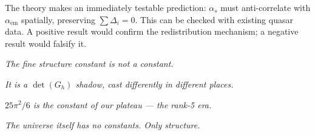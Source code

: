 The theory makes an immediately testable prediction: $\alpha_s$ must anti-correlate with $\alpha_\text{em}$ spatially, preserving $\sum\Delta_i = 0$. This can be checked with existing quasar data. A positive result would confirm the redistribution mechanism; a negative result would falsify it.

\begin{center}
\emph{The fine structure constant is not a constant.}

\emph{It is a $\det(G_h)$ shadow, cast differently in different places.}

\emph{$25\pi^2/6$ is the constant of our plateau --- the rank-5 era.}

\emph{The universe itself has no constants. Only structure.}
\end{center}
